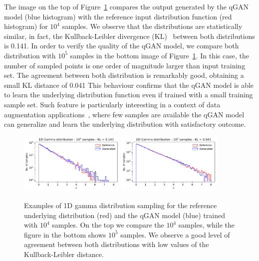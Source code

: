 \documentclass[twocolumn,preprintnumbers,superscriptaddress]{revtex4-2}
\begin{document}
The image on the top of Figure~\ref{fig:gamma} compares the output generated by
the qGAN model (blue histogram) with the reference input distribution function
(red histogram) for $10^4$ samples. We observe that the distributions are
statistically similar, in fact, the Kullback-Leibler divergence
(KL)~\cite{kullback1951information} between both distributions is 0.141.
%
In order to verify the quality of the qGAN model, we compare both distribution
with $10^5$ samples in the bottom image of Figure~\ref{fig:gamma}. In this case,
the number of sampled points is one order of magnitude larger than input
training set. The agreement between both distribution is remarkably good,
obtaining a small KL distance of 0.041
%
This behaviour confirms that the qGAN model is able to learn the underlying
distribution function even if trained with a small training sample set. Such
feature is particularly interesting in a context of data augmentation
applications~\cite{frid2018synthetic,tanaka2019data}, where few samples are available the qGAN model can
generalize and learn the underlying distribution with satisfactory outcome.

\begin{figure}
  \includegraphics[width=0.45\textwidth]{plots/1Dgamma/1Dgamma_distribution_10k.pdf}
  \includegraphics[width=0.45\textwidth]{plots/1Dgamma/1Dgamma_distribution_100k.pdf}
  \caption{\label{fig:gamma} Examples of 1D gamma distribution sampling for the
  reference underlying distribution (red) and the qGAN model (blue) trained with
  $10^4$ samples. On the top we compare the $10^4$ samples, while the figure in
  the bottom shows $10^5$ samples. We observe a good level of agreement between
  both distributions with low values of the Kullback-Leibler distance.}
\end{figure}
\end{document}
